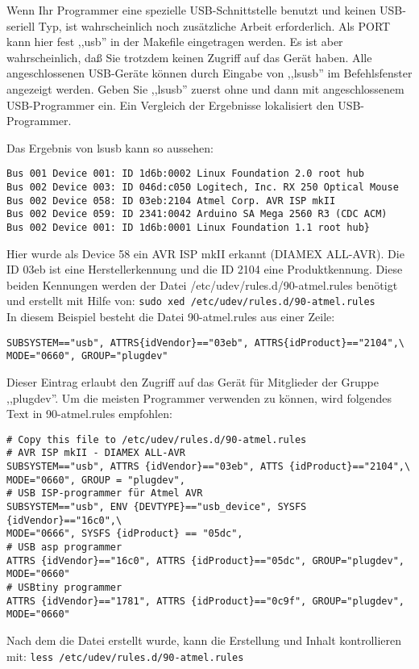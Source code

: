 Wenn Ihr Programmer eine spezielle USB-Schnittstelle benutzt und
keinen USB-seriell Typ, ist wahrscheinlich noch zusätzliche
Arbeit erforderlich. Als PORT kann hier fest ,,usb'' in der Makefile
eingetragen werden. Es ist aber wahrscheinlich, daß Sie trotzdem
keinen Zugriff auf das Gerät haben.
Alle angeschlossenen USB-Geräte können durch Eingabe von ,,lsusb'' im Befehlsfenster 
angezeigt werden.
Geben Sie ,,lsusb'' zuerst ohne und dann mit angeschlossenem USB-Programmer ein.
Ein Vergleich der Ergebnisse lokalisiert den USB-Programmer.

Das Ergebnis von lsusb kann so aussehen:
\begin{footnotesize}
\begin{verbatim}
Bus 001 Device 001: ID 1d6b:0002 Linux Foundation 2.0 root hub
Bus 002 Device 003: ID 046d:c050 Logitech, Inc. RX 250 Optical Mouse
Bus 002 Device 058: ID 03eb:2104 Atmel Corp. AVR ISP mkII
Bus 002 Device 059: ID 2341:0042 Arduino SA Mega 2560 R3 (CDC ACM)
Bus 002 Device 001: ID 1d6b:0001 Linux Foundation 1.1 root hub}
\end{verbatim}
\end{footnotesize}
Hier wurde als Device 58 ein AVR ISP mkII erkannt (DIAMEX ALL-AVR).
Die ID 03eb ist eine Herstellerkennung und die ID 2104 eine Produktkennung.
Diese beiden Kennungen werden der Datei /etc/udev/rules.d/90-atmel.rules benötigt und erstellt
mit Hilfe von:
\verb"sudo xed /etc/udev/rules.d/90-atmel.rules"\\
In diesem Beispiel besteht die Datei 90-atmel.rules aus einer Zeile:
\begin{footnotesize}
\begin{verbatim}
SUBSYSTEM=="usb", ATTRS{idVendor}=="03eb", ATTRS{idProduct}=="2104",\
MODE="0660", GROUP="plugdev"
\end{verbatim}
\end{footnotesize}
Dieser Eintrag erlaubt den Zugriff auf das Gerät für Mitglieder der Gruppe ,,plugdev''.
Um die meisten Programmer verwenden zu können, wird folgendes Text in 90-atmel.rules empfohlen:
\begin{footnotesize}
\begin{verbatim}
# Copy this file to /etc/udev/rules.d/90-atmel.rules
# AVR ISP mkII - DIAMEX ALL-AVR
SUBSYSTEM=="usb", ATTRS {idVendor}=="03eb", ATTS {idProduct}=="2104",\
MODE="0660", GROUP = "plugdev",
# USB ISP-programmer für Atmel AVR
SUBSYSTEM=="usb", ENV {DEVTYPE}=="usb_device", SYSFS {idVendor}=="16c0",\
MODE="0666", SYSFS {idProduct} == "05dc",
# USB asp programmer
ATTRS {idVendor}=="16c0", ATTRS {idProduct}=="05dc", GROUP="plugdev", MODE="0660"
# USBtiny programmer
ATTRS {idVendor}=="1781", ATTRS {idProduct}=="0c9f", GROUP="plugdev", MODE="0660"
\end{verbatim}
\end{footnotesize}
Nach dem die Datei erstellt wurde, kann die Erstellung und Inhalt kontrollieren mit:
\verb"less /etc/udev/rules.d/90-atmel.rules"\\ 

